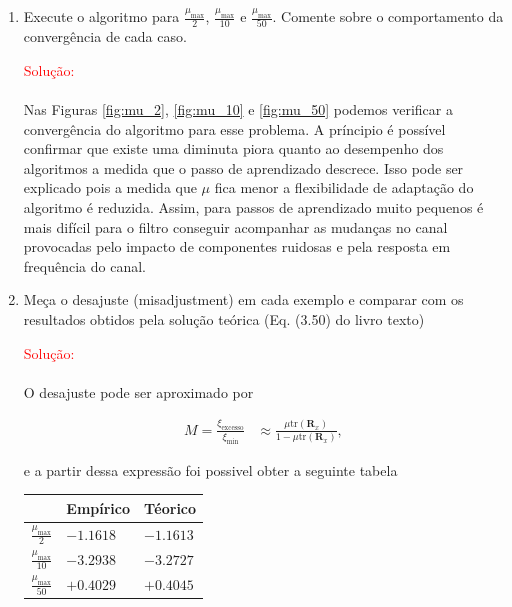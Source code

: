 \documentclass[a4paper,10pt]{article}
\begin{document}
\begin{enumerate}
\begin{enumerate}
					\item Execute o algoritmo para $\frac{\mu_{\text{max}}}{2}$, $\frac{\mu_{\text{max}}}{10}$ e $\frac{\mu_{\text{max}}}{50}$. Comente sobre o comportamento da convergência de cada caso.
						
						\textcolor{red}{Solução:}

						\paragraph{}Nas Figuras \ref{fig:mu_2}, \ref{fig:mu_10} e \ref{fig:mu_50} podemos verificar a convergência do algoritmo para esse problema. A príncipio é possível 
						confirmar que existe uma diminuta piora quanto ao desempenho dos algoritmos a medida que o passo de aprendizado descrece. Isso pode ser explicado pois a medida que 
						$\mu$ fica menor a flexibilidade de adaptação do algoritmo é reduzida. Assim, para passos de aprendizado muito pequenos é mais difícil para o filtro conseguir acompanhar
						as mudanças no canal provocadas pelo impacto de componentes ruidosas e pela resposta em frequência do canal. 

					\item Meça o desajuste (misadjustment) em cada exemplo e comparar com os resultados obtidos pela solução teórica (Eq. (3.50) do livro texto)					

						\textcolor{red}{Solução:}

						\paragraph{}O desajuste pode ser aproximado por

						\begin{align}
							M = \frac{\xi_{\text{excesso}}}{\xi_{\text{min}}} &\approx \frac{\mu \text{tr}(\mathbf{R}_{x})}{1 - \mu \text{tr}(\mathbf{R}_{x})},
						\end{align}

						e a partir dessa expressão foi possivel obter a seguinte tabela

						\begin{table}[H]
							\centering
							\begin{tabular}{|l|l|l|}
								\hline
							 	& Empírico & Téorico \\ \hline
							 	$\frac{\mu_{\text{max}}}{2}$ & $ -1.1618 $ &  $ -1.1613 $ \\ \hline
							 	$\frac{\mu_{\text{max}}}{10}$ & $ -3.2938 $ & $ -3.2727 $ \\ \hline
							 	$\frac{\mu_{\text{max}}}{50}$ & $ +0.4029 $ & $ +0.4045 $ \\ \hline
							\end{tabular}
						\end{table}


\end{enumerate}
\end{enumerate}
\end{document}
